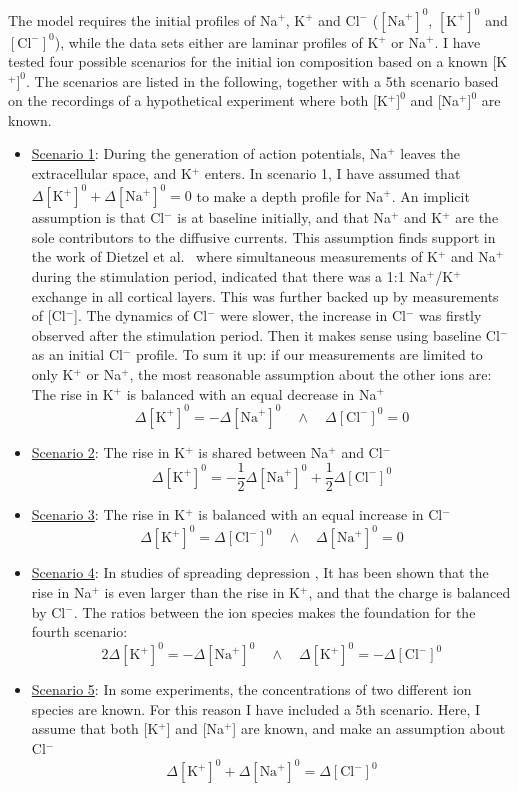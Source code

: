 \documentclass{uiophd}
\begin{document}
The model requires the initial profiles of Na$^+$, K$^+$ and Cl$^-$ ($[\text{Na}^+]^0$, $[\text{K}^+]^0$ and $[\text{Cl}^-]^0$), while the data sets either are laminar profiles of K$^+$ or Na$^+$. I have tested four possible scenarios for the initial ion composition based on a known [K$^+]^0$. The scenarios are listed in the following, together with a 5th scenario based on the recordings of a hypothetical experiment where  both [K$^+]^0$ and [Na$^+]^0$ are known.

\begin{itemize}\label{Scenarios}
	\item[]\underline{Scenario 1}: During the generation of action potentials, Na$^+$ leaves the extracellular space, and K$^+$ enters. In scenario 1, I have assumed that $\Delta [\text{K}^+]^0 + \Delta [\text{Na}^+]^0 = 0$ to make a depth profile for Na$^+$. An implicit assumption is that Cl$^-$ is at baseline initially, and that Na$^+$ and K$^+$ are the sole contributors to the diffusive currents. This assumption finds support in the work of Dietzel et al.\ \cite{Dietzel1982} where simultaneous measurements of K$^+$ and Na$^+$ during the stimulation period, indicated that there was a 1:1 Na$^+$/K$^+$ exchange in all cortical layers. This was further backed up by measurements of [Cl$^-$]. The dynamics of Cl$^-$ were slower, the increase in Cl$^-$ was firstly observed after the stimulation period. Then it makes sense using baseline Cl$^-$ as an initial Cl$^-$ profile. 
To sum it up: if our measurements are limited to only K$^+$ or Na$^+$, the most reasonable assumption about the other ions are:
	The rise in K$^+$ is balanced with an equal decrease in Na$^+$
	  $$\Delta [\text{K}^+]^0 = -\Delta [\text{Na}^+]^0 \quad \land \quad \Delta [\text{Cl}^-]^0 =0$$
	\item[]\underline{Scenario 2}:  The rise in K$^+$ is shared between Na$^+$ and Cl$^-$
	$$\Delta [\text{K}^+]^0 = -\frac{1}{2} \Delta [\text{Na}^+]^0 +\frac{1}{2} \Delta [\text{Cl}^-]^0 $$ 
		\item[]\underline{Scenario 3}:  The rise in K$^+$ is balanced with an equal increase in Cl$^-$
	  $$\Delta [\text{K}^+]^0 = \Delta [\text{Cl}^-]^0 \quad \land \quad \Delta [\text{Na}^+]^0 =0$$
	  \item[]\underline{Scenario 4}:  In studies of spreading depression \cite{Ataya2015}\cite{Herreras1993}, It has been shown that the rise in Na$^+$ is even larger than the rise in K$^+$, and that the charge is balanced by Cl$^-$. The ratios between the ion species makes the foundation for the fourth scenario:
	$$2\Delta [\text{K}^+]^0 = - \Delta [\text{Na}^+]^0 \quad \land \quad \Delta [\text{K}^+]^0 =  -\Delta [\text{Cl}^-]^0 $$ 
	\item[]\underline{Scenario 5}: In some experiments, the concentrations of two different ion species are known. For this reason I have included a 5th scenario. Here, I assume that both [K$^+$] and [Na$^+$] are known, and make an assumption about Cl$^-$
	$$\Delta [\text{K}^+]^0 + \Delta [\text{Na}^+]^0 = \Delta[\text{Cl}^-]^0 $$
\end{itemize}
\end{document}
